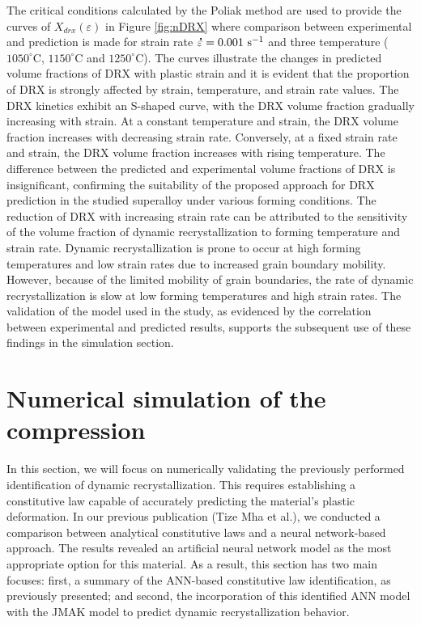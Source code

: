 \documentclass[metals,article,submit,pdftex,moreauthors]{Definitions/mdpi}
\makeatletter
\DeclareRobustCommand{\mdot}[1]{\accentset{\mbox{\bfseries .}}{#1}}
\DeclareRobustCommand{\eal}{et al.\@\xspace}
\DeclareRobustCommand{\ps}{\text{s}^{-1}}
\makeatother
\begin{document}
The critical conditions calculated by the Poliak method are used to provide the curves of $X_{drx}(\varepsilon)$ in Figure \ref{fig:nDRX} where comparison between experimental and prediction is made for strain rate $\mdot\varepsilon=0.001~\ps$ and three temperature ($1050^\circ$C, $1150^\circ$C and $1250^\circ$C).
The curves illustrate the changes in predicted volume fractions of DRX with plastic strain and it is evident that the proportion of DRX is strongly affected by strain, temperature, and strain rate values.
The DRX kinetics exhibit an S-shaped curve, with the DRX volume fraction gradually increasing with strain.
At a constant temperature and strain, the DRX volume fraction increases with decreasing strain rate.
Conversely, at a fixed strain rate and strain, the DRX volume fraction increases with rising temperature.
The difference between the predicted and experimental volume fractions of DRX is insignificant, confirming the suitability of the proposed approach for DRX prediction in the studied superalloy under various forming conditions.
The reduction of DRX with increasing strain rate can be attributed to the sensitivity of the volume fraction of dynamic recrystallization to forming temperature and strain rate.
Dynamic recrystallization is prone to occur at high forming temperatures and low strain rates due to increased grain boundary mobility.
However, because of the limited mobility of grain boundaries, the rate of dynamic recrystallization is slow at low forming temperatures and high strain rates.
The validation of the model used in the study, as evidenced by the correlation between experimental and predicted results, supports the subsequent use of these findings in the simulation section.

\section{Numerical simulation of the compression\label{sec:NumSim}}
In this section, we will focus on numerically validating the previously performed identification of dynamic recrystallization.
This requires establishing a constitutive law capable of accurately predicting the material's plastic deformation.
In our previous publication (Tize Mha \eal \cite{TizeMha-2023}), we conducted a comparison between analytical constitutive laws and a neural network-based approach.
The results revealed an artificial neural network model as the most appropriate option for this material.
As a result, this section has two main focuses: first, a summary of the ANN-based constitutive law identification, as previously presented; and second, the incorporation of this identified ANN model with the JMAK model to predict dynamic recrystallization behavior.
\end{document}
